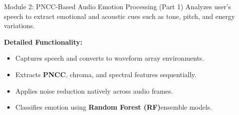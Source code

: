 \documentclass[11pt]{beamer}
\begin{document}
\begin{frame}{Module 2: PNCC-Based Audio Emotion Processing (Part 1)}
Analyzes user’s speech to extract emotional and acoustic cues such as tone, pitch, and energy variations.

\vspace{0.3cm}
\textbf{Detailed Functionality:}
\begin{itemize}
    \item Captures speech and converts to waveform array environments.
    \item Extracts \textbf{PNCC}, chroma, and spectral features sequentially.
    \item Applies noise reduction natively across audio frames.
    \item Classifies emotion using \textbf{Random Forest (RF)}ensemble models.
\end{itemize}
\end{frame}
\end{document}
